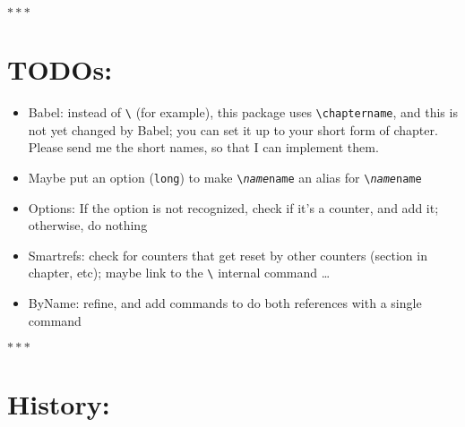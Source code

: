 \documentclass[pagesize=auto, parskip=half, headings=normal]{scrartcl}
\makeatletter
\newcommand*{\pkg}[1]{\textsf{#1}}
\newcommand*{\cs}[1]{\texttt{\textbackslash#1}}
\newcommand*{\cmd}[1]{\cs{\expandafter\@gobble\string#1}}
\newcommand*{\opt}[1]{\texttt{#1}}
\newcommand*{\meta}[1]{\textlangle\textsl{#1}\textrangle}
\makeatother
\begin{document}
\medskip\centerline{$***$}


\section*{TODOs:}

\begin{itemize}
\item \pkg{Babel}: instead of \cmd{\chaptername} (for example), this package uses
  \cmd{\short\-chapter\-name}, and this is not yet changed by \pkg{Babel}; you can
  set it up to your short form of chapter. Please send me the short
  names, so that I can implement them.

\item Maybe put an option (\opt{long}) to make \cmd{\short\meta{name}name} an alias for
  \cs{\meta{name}name}

\item Options: If the option is not recognized, check if it's a counter,
  and add it; otherwise, do nothing

\item Smartrefs: check for counters that get reset by other counters
  (section in chapter, etc); maybe link to the \cmd{\@addtoreset}
  internal command \dots

\item \pkg{ByName}: refine, and add commands to do both references with a single
  command
\end{itemize}

\medskip\centerline{$***$}


\section*{History:}

\end{document}
